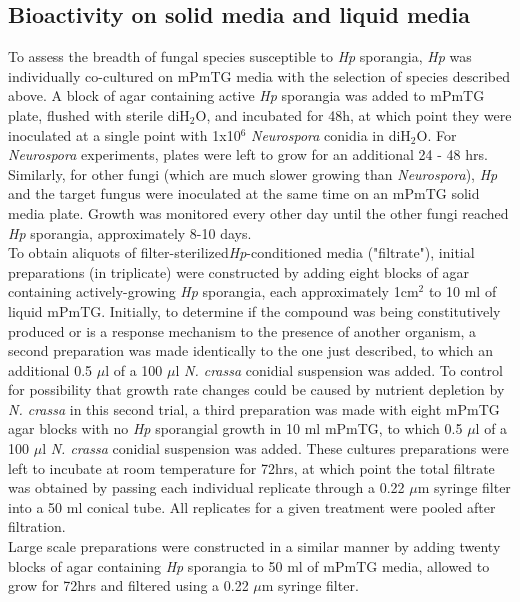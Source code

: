 \subsection*{Bioactivity on solid media and liquid media}
To assess the breadth of fungal species susceptible to \textit{Hp} sporangia, \textit{Hp} was individually co-cultured on mPmTG media with the selection of species described above. A block of agar containing active \textit{Hp} sporangia was added to mPmTG plate, flushed with sterile diH$_{2}$O, and incubated for 48h, at which point they were inoculated at a single point with 1x10$^{6}$ \textit{Neurospora} conidia in diH$_{2}$O. For \textit{Neurospora} experiments, plates were left to grow for an additional 24 - 48 hrs.\\
\indent Similarly, for other fungi (which are much slower growing than \textit{Neurospora}), \textit{Hp} and the target fungus were inoculated at the same time on an mPmTG solid media plate. Growth was monitored every other day until the other fungi reached \textit{Hp} sporangia, approximately 8-10 days.\\
\indent To obtain aliquots of filter-sterilized\textit{Hp}-conditioned media ("filtrate"), initial preparations (in triplicate) were constructed by adding eight blocks of agar containing actively-growing \textit{Hp} sporangia, each approximately 1cm$^{2}$ to 10 ml of liquid mPmTG. Initially, to determine if the compound was being constitutively produced or is a response mechanism to the presence of another organism, a second preparation was made identically to the one just described, to which an additional 0.5 $\mu$l of a 100 $\mu$l  \textit{N. crassa} conidial suspension was added. To control for possibility that growth rate changes could be caused by nutrient depletion by \textit{N. crassa} in this second trial, a third preparation was made with eight mPmTG agar blocks with no \textit{Hp} sporangial growth in 10 ml mPmTG, to which 0.5 $\mu$l of a 100 $\mu$l \textit{N. crassa} conidial suspension was added. These cultures preparations were left to incubate at room temperature for 72hrs, at which point the total filtrate was obtained by passing each individual replicate through a 0.22 $\mu$m syringe filter into a 50 ml conical tube. All replicates for a given treatment were pooled after filtration. \\
\indent Large scale preparations were constructed in a similar manner by adding twenty blocks of agar containing \textit{Hp} sporangia to 50 ml of mPmTG media, allowed to grow for 72hrs and filtered using a 0.22 $\mu$m syringe filter.\\
